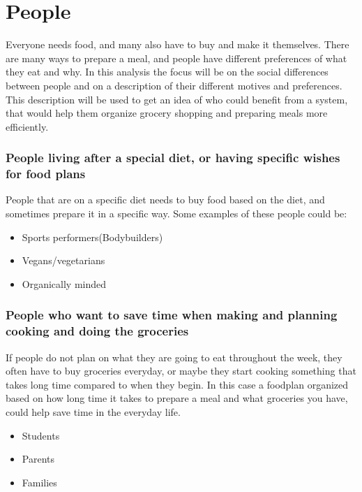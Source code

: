 \section{People}
Everyone needs food, and many also have to buy and make it themselves. There are many ways to prepare a meal, and people have different preferences of what they eat and why. In this analysis the focus will be on the social differences between people and on a description of their different motives and preferences. This description will be used to get an idea of who could benefit from a system, that would help them organize grocery shopping and preparing meals more efficiently.

\subsubsection{People living after a special diet, or having specific wishes for food plans}
People that are on a specific diet needs to buy food based on the diet, and sometimes prepare it in a specific way.
Some examples of these people could be:
\begin{itemize}
\item Sports performers(Bodybuilders)
\item Vegans/vegetarians
\item Organically minded
\end{itemize}

\subsubsection{People who want to save time when making and planning cooking and doing the groceries} 
If people do not plan on what they are going to eat throughout the week, they often have to buy groceries everyday, or maybe they start cooking something that takes long time compared to when they begin. In this case a foodplan organized based on how long time it takes to prepare a meal and what groceries you have, could help save time in the everyday life.
\begin{itemize}
\item Students
\item Parents
\item Families
\end{itemize}

